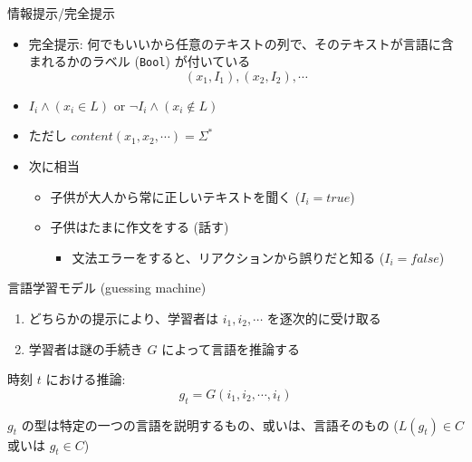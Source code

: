 \documentclass[professionalfont, 12pt, dvipdfmx, default, cjk]{beamer}
\begin{document}
\begin{frame}{情報提示/完全提示}

\begin{itemize}
\item
  完全提示:
  何でもいいから任意のテキストの列で、そのテキストが言語に含まれるかのラベル
  (\texttt{Bool}) が付いている \[(x_1, I_1), (x_2, I_2), \cdots\]
\item
  \(I_i \land (x_i \in L)\) \hspace{1mm} or \hspace{1mm}
  \(\lnot I_i \land (x_i \not\in L)\)
\item
  ただし \(content(x_1, x_2, \cdots) = \Sigma^*\)
\end{itemize}

\pause
\small

\begin{itemize}
\itemsep1pt\parskip0pt
\item
  次に相当

  \begin{itemize}
  \itemsep1pt\parskip0pt
  \item
    子供が大人から常に正しいテキストを聞く (\(I_i = true\))
  \item
    子供はたまに作文をする (話す)

    \begin{itemize}
    \itemsep1pt\parskip0pt
    \item
      文法エラーをすると、リアクションから誤りだと知る (\(I_i = false\))
    \end{itemize}
  \end{itemize}
\end{itemize}

\end{frame}

\begin{frame}{言語学習モデル (guessing machine)}

\begin{enumerate}
\def\labelenumi{\arabic{enumi}.}
\itemsep1pt\parskip0pt
\item
  どちらかの提示により、学習者は \(i_1, i_2, \cdots\) を逐次的に受け取る
\item
  学習者は謎の手続き \(G\) によって言語を推論する
\end{enumerate}

時刻 \(t\) における推論: \[g_t = G(i_1, i_2, \cdots, i_t)\]

\(g_t\) の型は特定の一つの言語を説明するもの、或いは、言語そのもの
(\(L(g_t) \in C\) 或いは \(g_t \in C\))

\end{frame}
\end{document}
